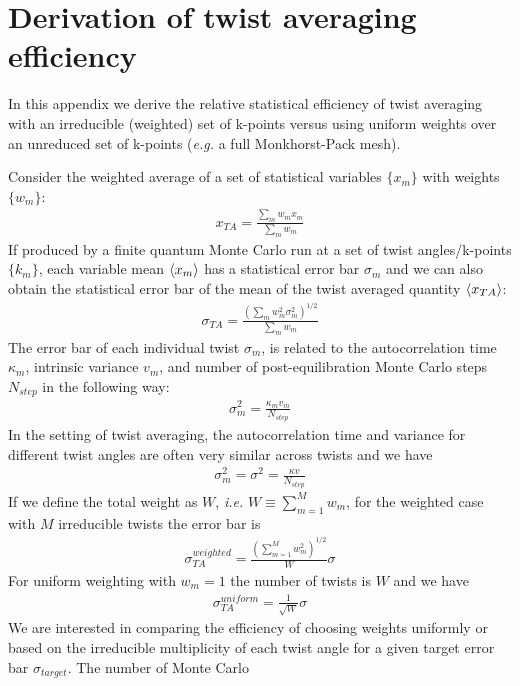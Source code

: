 \chapter{Derivation of twist averaging efficiency}
\label{sec:app_ta_efficiency}
In this appendix we derive the relative statistical efficiency of 
twist averaging with an irreducible (weighted) set of k-points 
versus using uniform weights over an unreduced set of k-points 
(\emph{e.g.} a full Monkhorst-Pack mesh).

Consider the weighted average of a set of statistical variables 
$\{x_m\}$ with weights $\{w_m\}$:
\begin{align}
  x_{TA} = \frac{\sum_mw_mx_m}{\sum_mw_m}
\end{align} 
If produced by a finite quantum Monte Carlo run at a set of 
twist angles/k-points $\{k_m\}$, each variable mean $\langle x_m \rangle$ 
has a statistical error bar $\sigma_m$ and we can also obtain 
the statistical error bar of the mean of the twist averaged 
quantity $\langle x_{TA} \rangle$:
\begin{align}
  \sigma_{TA} = \frac{\left(\sum_mw_m^2\sigma_m^2\right)^{1/2}}{\sum_mw_m}
\end{align}
The error bar of each individual twist $\sigma_m$, is related to the 
autocorrelation time $\kappa_m$,  intrinsic variance $v_m$, and number 
of post-equilibration Monte Carlo steps $N_{step}$ in the following way:
\begin{align}
  \sigma_m^2=\frac{\kappa_mv_m}{N_{step}}
\end{align}
In the setting of twist averaging, the autocorrelation time and 
variance for different twist angles are often very similar across 
twists and we have
\begin{align}
  \sigma_m^2=\sigma^2=\frac{\kappa v}{N_{step}}
\end{align} 
If we define the total weight as $W$, \emph{i.e.} $W\equiv\sum_{m=1}^Mw_m$, 
for the weighted case with $M$ irreducible twists the error bar is
\begin{align}
  \sigma_{TA}^{weighted}=\frac{\left(\sum_{m=1}^Mw_m^2\right)^{1/2}}{W}\sigma
\end{align}
For uniform weighting with $w_m=1$ the number of twists is $W$ and 
we have
\begin{align}
  \sigma_{TA}^{uniform}=\frac{1}{\sqrt{W}}\sigma
\end{align}
We are interested in comparing the efficiency of choosing weights 
uniformly or based on the irreducible multiplicity of each twist angle 
for a given target error bar $\sigma_{target}$.  The number of Monte Carlo  

